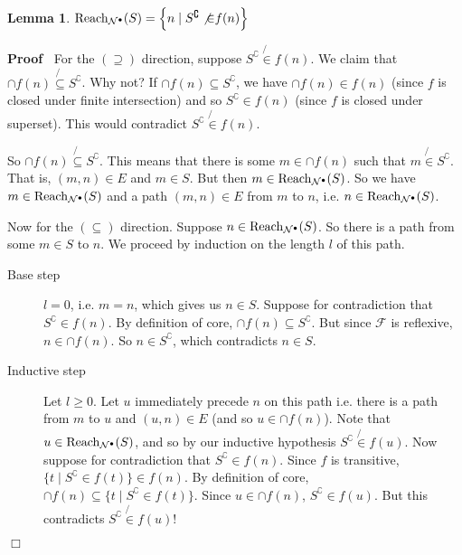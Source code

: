 \documentclass{article}
\newcommand{\tmop}[1]{\ensuremath{\operatorname{#1}}}
\newenvironment{proof}{\noindent\textbf{Proof\ }}{\hspace*{\fill}$\Box$\medskip}
\newtheorem{lemma}{Lemma}
\newcommand{\Net}{\ensuremath{\mathcal{N}}}
\newcommand{\Reach}{\textsf{\tmop{Reach}}}
\begin{document}
\begin{lemma}
  \label{lemma-Reach-and-R*}$\Reach_{\Net^{\bullet}} (S) = \left\{ n \mid
  S^{\complement} \not{\in} f (n) \right\}$
\end{lemma}

\begin{proof}
  For the $(\supseteq)$ direction, suppose $S^{\complement} \not{\in} f (n)$.
  We claim that $\cap f (n) \not{\subseteq} S^{\complement}$. Why not? If
  $\cap f (n) \subseteq S^{\complement}$, we have $\cap f (n) \in f (n)$
  (since $f$ is closed under finite intersection) and so $S^{\complement} \in
  f (n)$ (since $f$ is closed under superset). This would contradict
  $S^{\complement} \not{\in} f (n)$.
  
  So $\cap f (n) \not{\subseteq} S^{\complement}$. This means that there is
  some $m \in \cap f (n)$ such that $m \not{\in} S^{\complement}$. That is,
  $(m, n) \in E$ and $m \in S$. But then $m \in \Reach_{\Net^{\bullet}} (S)$.
  So we have $m \in \Reach_{\Net^{\bullet}} (S)$ and a path $(m, n) \in E$
  from $m$ to $n$, i.e. $n \in \Reach_{\Net^{\bullet}} (S)$.
  
  Now for the $(\subseteq)$ direction. Suppose $n \in \Reach_{\Net^{\bullet}}
  (S)$. So there is a path from some $m \in S$ to $n$. We proceed by induction
  on the length $l$ of this path.
  \begin{description}
    \item[Base step] $l = 0$, i.e. $m = n$, which gives us $n \in S$. Suppose
    for contradiction that $S^{\complement} \in f (n)$. By definition of core,
    $\cap f (n) \subseteq S^{\complement}$. But since $\mathcal{F}$ is
    reflexive, $n \in \cap f (n)$. So $n \in S^{\complement}$, which
    contradicts $n \in S$.
    
    \item[Inductive step] Let $l \geqslant 0$. Let $u$ immediately precede $n$
    on this path i.e. there is a path from $m$ to $u$ and $(u, n) \in E$ (and
    so $u \in \cap f (n)$). Note that $u \in \Reach_{\Net^{\bullet}} (S)$, and
    so by our inductive hypothesis $S^{\complement} \not{\in} f (u)$. Now
    suppose for contradiction that $S^{\complement} \in f (n)$. Since $f$ is
    transitive, $\{ t \mid S^{\complement} \in f (t) \} \in f (n)$. By
    definition of core, $\cap f (n) \subseteq \{ t \mid S^{\complement} \in f
    (t) \}$. Since $u \in \cap f (n)$, $S^{\complement} \in f (u)$. But this
    contradicts $S^{\complement} \not{\in} f (u)$!
  \end{description}
\end{proof}
\end{document}
